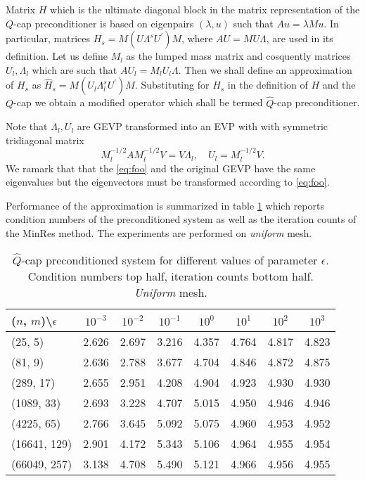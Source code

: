 \documentclass[10pt, a4paper]{article}
\newcommand{\dual}[1]{\ensuremath{{#1}^{\prime}}}
\begin{document}
Matrix $H$ which is the ultimate diagonal block in the matrix representation of
the $Q$-cap preconditioner is based on eigenpairs $(\lambda, u)$ such that 
$Au=\lambda M u$. In particular, matrices $H_s=M(U\Lambda^s \dual{U})M$, where
$AU=MU\Lambda$, are used in its definition. Let us define $M_l$ as the lumped
mass matrix and cosquently matrices $U_l, \Lambda_l$ which are such that
$AU_l=M_l U_l\Lambda$. Then we shall define an approximation of $H_s$ as
$\hat{H}_s=M(U_l\Lambda^s_l\dual{U})M$. Substituting for $H_s$ in the definition
of $H$ and the $Q$-cap we obtain a modified operator which shall be termed 
$\hat{Q}$-cap preconditioner.

Note that $\Lambda_l, U_l$ are GEVP transformed into an EVP with with symmetric 
tridiagonal matrix
\begin{equation}\label{eq:foo}
  M_l^{-1/2}A M_l^{-1/2} V=V\Lambda_l,\quad U_l=M_l^{-1/2} V.
\end{equation}
We ramark that that the \eqref{eq:foo} and the original GEVP have the same
eigenvalues but the eigenvectors must be transformed according to
\eqref{eq:foo}.

Performance of the approximation is summarized in table \ref{tab:hatQcap} which
reports condition numbers of the preconditioned system as well as the iteration
counts of the MinRes method. The experiments are performed on \textit{uniform}
mesh. 

\begin{table}[hb]
  \caption{$\hat{Q}$-cap preconditioned system for different values of parameter $\epsilon$. 
  Condition numbers top half, iteration counts bottom half. \textit{Uniform} mesh.
}
\label{tab:hatQcap}
\footnotesize{
\begin{tabular}{l|ccccccc}
\hline
($n$, $m$)\textbackslash $\epsilon$ & $10^{-3}$ & $10^{-2}$ & $10^{-1}$ & $10^{0}$ & $10^{1}$ & $10^{2}$ & $10^{3}$\\
\hline
(25, 5) & 2.626 & 2.697 & 3.216 & 4.357 & 4.764 & 4.817 & 4.823\\
(81, 9) & 2.636 & 2.788 & 3.677 & 4.704 & 4.846 & 4.872 & 4.875\\
(289, 17) & 2.655 & 2.951 & 4.208 & 4.904 & 4.923 & 4.930 & 4.930\\
(1089, 33) & 2.693 & 3.228 & 4.707 & 5.015 & 4.950 & 4.946 & 4.946\\
(4225, 65) & 2.766 & 3.645 & 5.092 & 5.075 & 4.960 & 4.953 & 4.952\\
(16641, 129) & 2.901 & 4.172 & 5.343 & 5.106 & 4.964 & 4.955 & 4.954\\
(66049, 257) & 3.138 & 4.708 & 5.490 & 5.121 & 4.966 & 4.956 & 4.955\\
\hline
\hline
\end{tabular}
}
\end{table}
\end{document}
